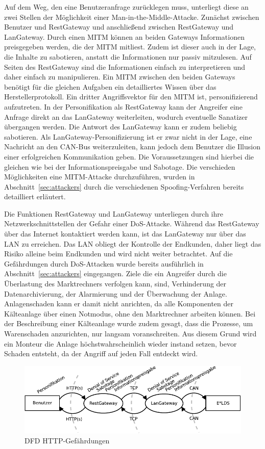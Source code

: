 \documentclass[11pt,a4paper]{report}
\begin{document}
Auf dem Weg, den eine Benutzeranfrage zurücklegen muss, unterliegt diese an zwei Stellen der Möglichkeit einer Man-in-the-Middle-Attacke. Zunächst zwischen Benutzer und RestGateway und anschließend zwischen RestGateway und LanGateway. Durch einen MITM können an beiden Gateways Informationen preisgegeben werden, die der MITM mitliest. Zudem ist dieser auch in der Lage, die Inhalte zu sabotieren, anstatt die Informationen nur passiv mitzulesen. Auf Seiten des RestGateway sind die Informationen einfach zu interpretieren und daher einfach zu manipulieren. Ein MITM zwischen den beiden Gateways benötigt für die gleichen Aufgaben ein detailliertes Wissen über das Herstellerprotokoll. Ein dritter Angriffsvektor für den MITM ist, personifizierend aufzutreten. In der Personifikation als RestGateway kann der Angreifer eine Anfrage direkt an das LanGateway weiterleiten, wodurch eventuelle Sanatizer übergangen werden. Die Antwort des LanGateway kann er zudem beliebig sabotieren. Als LanGateway-Personifizierung ist er zwar nicht in der Lage, eine Nachricht an den CAN-Bus weiterzuleiten, kann jedoch dem Benutzer die Illusion einer erfolgreichen Kommunikation geben. Die Voraussetzungen sind hierbei die gleichen wie bei der Informationspreisgabe und Sabotage. Die verschieden Möglichkeiten eine MITM-Attacke durchzuführen, wurden in Abschnitt~\ref{sec:attackers} durch die verschiedenen Spoofing-Verfahren bereits detailliert erläutert.

Die Funktionen RestGateway und LanGateway unterliegen durch ihre Netzwerkschnittstellen der Gefahr einer DoS-Attacke. Während das RestGateway über das Internet kontaktiert werden kann, ist das LanGateway nur über das LAN zu erreichen. Das LAN obliegt der Kontrolle der Endkunden, daher liegt das Risiko alleine beim Endkunden und wird nicht weiter betrachtet. Auf die Gefährdungen durch DoS-Attacken wurde bereits ausführlich in Abschnitt~\ref{sec:attackers} eingegangen. Ziele die ein Angreifer durch die Überlastung des Marktrechners verfolgen kann, sind, Verhinderung der Datenarchivierung, der Alarmierung und der Überwachung der Anlage. Anlagenschaden kann er damit nicht anrichten, da alle Komponenten der Kälteanlage über einen Notmodus, ohne den Marktrechner arbeiten können. Bei der Beschreibung einer Kälteanlage wurde zudem gesagt, dass die Prozesse, um Warenschaden anzurichten, nur langsam voranschreiten. Aus diesem Grund wird ein Monteur die Anlage höchstwahrscheinlich wieder instand setzen, bevor Schaden entsteht, da der Angriff auf jeden Fall entdeckt wird.

\begin{figure}[htbp]
\centering
\includegraphics[scale=1]{images/dfd_http_threat.pdf}
\caption{DFD HTTP-Gefährdungen}
\label{fig:dfd_http_threat}
\end{figure}
\end{document}

